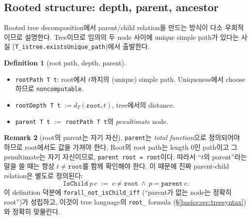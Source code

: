 \documentclass[11pt]{article}
\theoremstyle{definition}
\newtheorem{definition}{Definition}[section]
\newtheorem{remark}[definition]{Remark}
\theoremstyle{plain}
\newcommand{\lean}[1]{\texttt{#1}}
\begin{document}
\subsection{Rooted structure: depth, parent, ancestor}

Rooted tree decomposition에서 parent/child relation을 만드는 방식이 다소
우회적이므로 설명한다. Tree이므로 임의의 두 node 사이에 unique simple path가
있다는 사실 (\lean{T\_istree.existsUnique\_path})에서 출발한다.

\begin{definition}[root path, depth, parent]
\label{basics:def:parent}
\begin{itemize}
  \item \lean{rootPath T t}: root에서 $t$까지의 (unique) simple path.
    Uniqueness에서 choose하므로 \lean{noncomputable}.
  \item \lean{rootDepth T t} $:= d_T(\lean{root}, t)$, tree에서의 distance.
  \item \lean{parent T t} $:=$ \lean{rootPath T t}의 \emph{penultimate} node.
\end{itemize}
\end{definition}

\begin{remark}[root의 parent는 자기 자신]
\label{basics:rem:parentroot}
\lean{parent}는 \emph{total function}으로 정의되어야 하므로 root에서도 값을
가져야 한다. Root의 root path는 length $0$인 path이고 그 penultimate는 자기
자신이므로, \lean{parent root = root}이다. 따라서 ``$t$의 parent''라는 말을
쓸 때는 항상 $t \neq \lean{root}$를 함께 확인해야 한다. 이 때문에 진짜
parent-child relation은 별도로 정의된다:
\[
  \lean{IsChild}\ p\ c \;:=\; c \neq \lean{root} \ \land\ p = \lean{parent}\ c.
\]
이 definition 덕분에 \lean{forall\_not\_isChild\_iff} (``parent가 없는 node는
정확히 root'')가 성립하고, 이것이 tree language의 \lean{root\_} formula
(\S\ref{basics:sec:treesyntax})와 정확히 맞물린다.
\end{remark}
\end{document}
